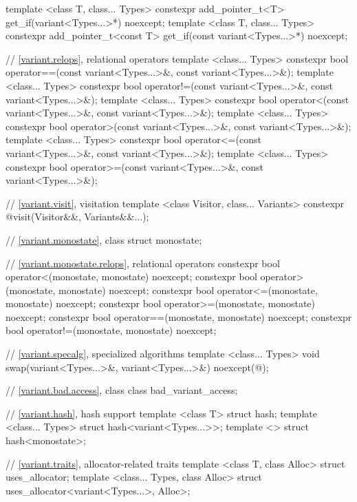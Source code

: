 \begin{codeblock}
{  template <class T, class... Types>
    constexpr add_pointer_t<T>
      get_if(variant<Types...>*) noexcept;
  template <class T, class... Types>
    constexpr add_pointer_t<const T>
      get_if(const variant<Types...>*) noexcept;

  // \ref{variant.relops}, relational operators
  template <class... Types>
    constexpr bool operator==(const variant<Types...>&, const variant<Types...>&);
  template <class... Types>
    constexpr bool operator!=(const variant<Types...>&, const variant<Types...>&);
  template <class... Types>
    constexpr bool operator<(const variant<Types...>&, const variant<Types...>&);
  template <class... Types>
    constexpr bool operator>(const variant<Types...>&, const variant<Types...>&);
  template <class... Types>
    constexpr bool operator<=(const variant<Types...>&, const variant<Types...>&);
  template <class... Types>
    constexpr bool operator>=(const variant<Types...>&, const variant<Types...>&);

  // \ref{variant.visit}, visitation
  template <class Visitor, class... Variants>
    constexpr @\seebelow@ visit(Visitor&&, Variants&&...);

  // \ref{variant.monostate}, class 
  struct monostate;

  // \ref{variant.monostate.relops},  relational operators
  constexpr bool operator<(monostate, monostate) noexcept;
  constexpr bool operator>(monostate, monostate) noexcept;
  constexpr bool operator<=(monostate, monostate) noexcept;
  constexpr bool operator>=(monostate, monostate) noexcept;
  constexpr bool operator==(monostate, monostate) noexcept;
  constexpr bool operator!=(monostate, monostate) noexcept;

  // \ref{variant.specalg}, specialized algorithms
  template <class... Types>
    void swap(variant<Types...>&, variant<Types...>&) noexcept(@\seebelow@);

  // \ref{variant.bad.access}, class 
  class bad_variant_access;

  // \ref{variant.hash}, hash support
  template <class T> struct hash;
  template <class... Types> struct hash<variant<Types...>>;
  template <> struct hash<monostate>;

  // \ref{variant.traits}, allocator-related traits
  template <class T, class Alloc> struct uses_allocator;
  template <class... Types, class Alloc> struct uses_allocator<variant<Types...>, Alloc>;
}
\end{codeblock}

